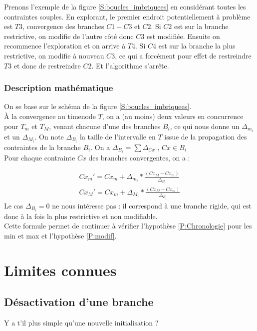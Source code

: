 \documentclass[10pt,a4paper]{article}
\newcommand{\hyporef}[1]{l'hypothèse \ref{#1}}
\begin{document}
	
Prenons l'exemple de la figure \ref{S:boucles_imbriquees} en considérant toutes les contraintes souples. En explorant, le premier endroit potentiellement à problème est $T3$, convergence des branches $C1 - C3$ et $C2$. Si $C2$ est sur la branche restrictive, on modifie de l'autre côté donc $C3$ est modifiée. Ensuite on recommence l'exploration et on arrive à $T4$. Si $C4$ est sur la branche la plus restrictive, on modifie à nouveau $C3$, ce qui a forcément pour effet de restreindre $T3$ et donc de restreindre $C2$. Et l'algorithme s'arrête.

		\subsubsection{Description mathématique}

On se base sur le schéma de la figure \ref{S:boucles_imbriquees}.\\
À la convergence au timenode $T$, on a (au moins) deux valeurs en concurrence pour $T_m$ et $T_M$, venant chacune d'une des branches $B_i$, ce qui nous donne un $\Delta_{m_i}$ et un $\Delta_{M_i}$. On note $\Delta_{B_i}$ la taille de l'intervalle en $T$ issue de la propagation des contraintes de la branche $B_i$. On a $\Delta_{B_i} = \sum \Delta_{Cx} \text{ , }Cx \in B_i$ \\
Pour chaque contrainte $Cx$ des branches convergentes, on a :

\begin{eqnarray}
	\label{E:init:scale}
	Cx_{m}' = Cx_m + \Delta_{m_i} *\frac{(Cx_M - Cx_m)}{\Delta_{B_i}}\\
	Cx_{M}' = Cx_m + \Delta_{M_i} *\frac{(Cx_M - Cx_m)}{\Delta_{B_i}} \nonumber
\end{eqnarray}
Le cas $\Delta_{B_i} = 0$ ne nous intéresse pas : il correspond à une branche rigide, qui est donc à la fois la plus restrictive et non modifiable.\\
Cette formule permet de continuer à vérifier \hyporef{P:Chronologie} pour les min et max et \hyporef{P:modif}.

\section{Limites connues}
	
	\subsection{Désactivation d'une branche}
Y a t'il plus simple qu'une nouvelle initialisation ?
\end{document}
